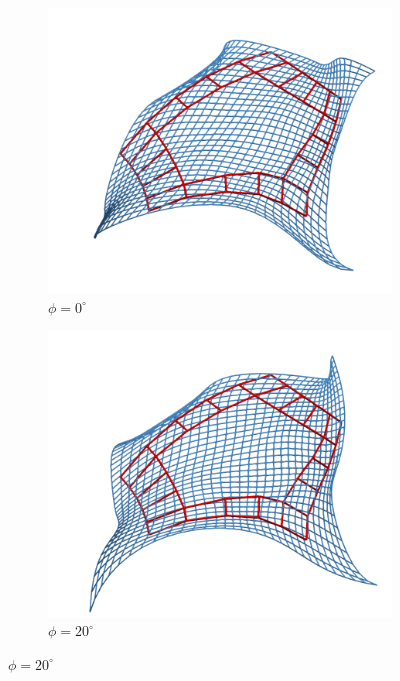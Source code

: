 \documentclass[9pt,academicons]{article}
\begin{document}
\begin{figure}[!ht]
  {
    \hfill
    \begin{subfigure}{.26\textwidth}
      \includegraphics[width=\textwidth]{images/rotations/00.png}
      \caption{$\phi=0^\circ$}
    \end{subfigure}
    \hfill
    \begin{subfigure}{.26\textwidth}
      \includegraphics[width=\textwidth]{images/rotations/20.png}
      \caption{$\phi=20^\circ$}
    \end{subfigure}
    \hfill
}
\end{figure}
\end{document}
